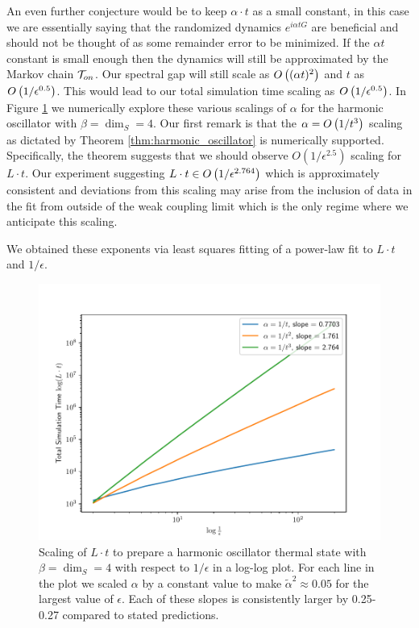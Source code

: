 An even further conjecture would be to keep $\alpha \cdot t$ as a small constant, in this case we are essentially saying that the randomized dynamics $e^{i \alpha t G}$ are beneficial and should not be thought of as some remainder error to be minimized. If the $\alpha t$ constant is small enough then the dynamics will still be approximated by the Markov chain $\mathcal{T}_{on}$. Our spectral gap will still scale as $O\left( (\alpha t)^2 \right)$ and $t$ as $O\left( 1/\epsilon^{0.5} \right)$. This would lead to our total simulation time scaling as $O\left( 1/\epsilon^{0.5} \right)$. In Figure \ref{fig:epsilon_scaling} we numerically explore these various scalings of $\alpha$ for the harmonic oscillator with $\beta = \dim_S = 4$. Our first remark is that the $\alpha = O\left( 1/t^3 \right)$ scaling as dictated by Theorem \ref{thm:harmonic_oscillator} is numerically supported. 
 Specifically, the theorem suggests that we should observe $O(1/\epsilon^{2.5})$ scaling for $L\cdot t$. 
 Our experiment suggesting $L \cdot t \in O\left( 1/\epsilon^{2.764} \right)$ which is approximately consistent and deviations from this scaling may arise from the inclusion of data in the fit from outside of the weak coupling limit which is the only regime where we anticipate this scaling. 
 
 We obtained these exponents via least squares fitting of a power-law fit to $L\cdot t$ and $1/\epsilon$. 


\begin{figure}
    \centering
    \includegraphics[width=0.66\linewidth]{tsp_numerics/data/epsilon_fitting_4.pdf}
    \caption{Scaling of $L \cdot t$ to prepare a harmonic oscillator thermal state with $\beta = \dim_S = 4$ with respect to $1/\epsilon$ in a log-log plot. For each line in the plot we scaled $\alpha$ by a constant value to make $\widetilde{\alpha}^2 \approx 0.05$ for the largest value of $\epsilon$. Each of these slopes is consistently larger by 0.25-0.27 compared to stated predictions.}
    \label{fig:epsilon_scaling}
\end{figure}



